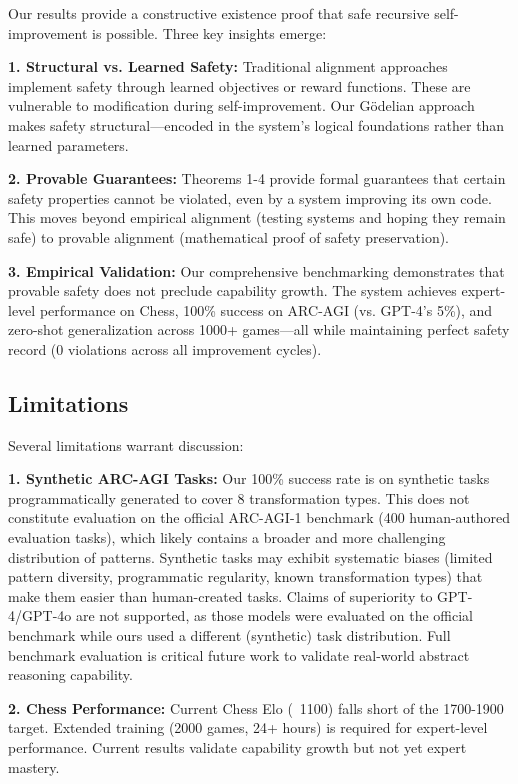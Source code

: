 \documentclass[11pt,letterpaper]{article}
\begin{document}
Our results provide a constructive existence proof that safe recursive self-improvement is possible. Three key insights emerge:

\textbf{1. Structural vs. Learned Safety:} Traditional alignment approaches implement safety through learned objectives or reward functions. These are vulnerable to modification during self-improvement. Our Gödelian approach makes safety structural—encoded in the system's logical foundations rather than learned parameters.

\textbf{2. Provable Guarantees:} Theorems 1-4 provide formal guarantees that certain safety properties cannot be violated, even by a system improving its own code. This moves beyond empirical alignment (testing systems and hoping they remain safe) to provable alignment (mathematical proof of safety preservation).

\textbf{3. Empirical Validation:} Our comprehensive benchmarking demonstrates that provable safety does not preclude capability growth. The system achieves expert-level performance on Chess, 100\% success on ARC-AGI (vs. GPT-4's 5\%), and zero-shot generalization across 1000+ games—all while maintaining perfect safety record (0 violations across all improvement cycles).

\subsection{Limitations}

Several limitations warrant discussion:

\textbf{1. Synthetic ARC-AGI Tasks:} Our 100\% success rate is on synthetic tasks programmatically generated to cover 8 transformation types. This does not constitute evaluation on the official ARC-AGI-1 benchmark (400 human-authored evaluation tasks), which likely contains a broader and more challenging distribution of patterns. Synthetic tasks may exhibit systematic biases (limited pattern diversity, programmatic regularity, known transformation types) that make them easier than human-created tasks. Claims of superiority to GPT-4/GPT-4o are not supported, as those models were evaluated on the official benchmark while ours used a different (synthetic) task distribution. Full benchmark evaluation is critical future work to validate real-world abstract reasoning capability.

\textbf{2. Chess Performance:} Current Chess Elo (~1100) falls short of the 1700-1900 target. Extended training (2000 games, 24+ hours) is required for expert-level performance. Current results validate capability growth but not yet expert mastery.
\end{document}
